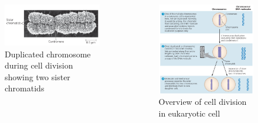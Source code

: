 \documentclass[11pt,ignorenonframetext,aspectratio=169]{beamer}
\begin{document}
\begin{frame}{}
\protect\hypertarget{section-9}{}
\begin{columns}[T,onlytextwidth]
  

\begin{figure}

{\centering \includegraphics[width=0.8\linewidth]{../images/duplicated_chromosomes_hd} 

}

\caption{Duplicated chromosome during cell division showing two sister chromatids}\label{fig:duplicated-chromosome}
\end{figure}


\begin{figure}
\includegraphics[width=0.95\linewidth]{../images/cell_division_eukaryotes_overview} \caption{Overview of cell division in eukaryotic cell}\label{fig:overview-cell-division}
\end{figure}

\end{columns}
\end{frame}
\end{document}
